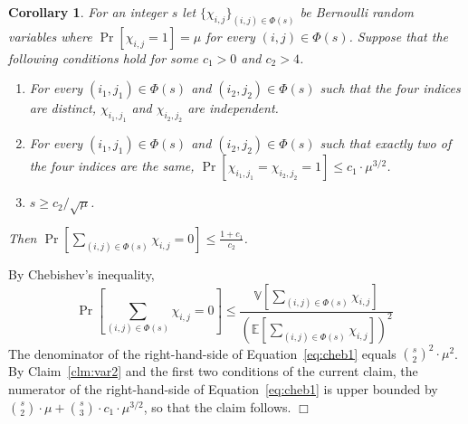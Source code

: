 \documentclass{article}
\newcommand{\Ex}{\mathbb{E}}
\newcommand{\Var}{\mathbb{V}}
\newenvironment{proof}{\smallskip\noindent{\bf Proof:}}%
        {\hspace*{\fill}$\Box$\par}
\newtheorem{corollary}[theorem]{Corollary}
\newcommand{\talya}[1]{{} }
\begin{document}
\begin{corollary}\label{cor:cheb1}
For an integer $s$
let $\{\chi_{i,j}\}_{(i,j)\in \Phi(s)}$ be Bernoulli random variables where
 $\Pr[\chi_{i,j} = 1] = \mu$ for every $(i,j)\in \Phi(s)$. Suppose that the following conditions hold
 for some $c_1>0$ and $c_2 > 4$.
\begin{enumerate}
\item For every $(i_1,j_1)\in \Phi(s)$ and $(i_2,j_2)\in \Phi(s)$ such that the four indices are distinct, $\chi_{i_1,j_1}$
and $\chi_{i_2,j_2}$ are independent.
\item For every $(i_1,j_1)\in \Phi(s)$ and $(i_2,j_2)\in \Phi(s)$  such that exactly two of the four indices are the same,
$\Pr[\chi_{i_1,j_1}=\chi_{i_2,j_2} = 1] \leq c_1\cdot \mu^{3/2}$.
\item %
   $s \geq c_2/\sqrt{\mu}$\;.
\end{enumerate}
Then $\Pr\left[ \sum_{(i,j)\in \Phi(s)} \chi_{i,j} = 0\right] \leq \frac{1+c_1}{c_2}$.
\end{corollary}

\begin{proof}
By Chebishev's inequality,
\begin{equation}\label{eq:cheb1}
\Pr\left[\sum_{(i,j)\in \Phi(s)}\chi_{i,j}=0\right] \leq \frac{\Var\left[\sum_{(i,j)\in \Phi(s)} \chi_{i,j}\right]}{\left(\Ex\left[\sum_{(i,j)\in \Phi(s)}\chi_{i,j}\right]\right)^2}\;
\end{equation}
The denominator of the right-hand-side of Equation~\eqref{eq:cheb1} equals
${s\choose 2}^2\cdot \mu^2$.
By Claim~\ref{clm:var2} and the first two conditions of the current claim, the numerator of the right-hand-side of Equation~\eqref{eq:cheb1} is upper bounded by
${s\choose 2}\cdot \mu + {s\choose 3}\cdot c_1\cdot \mu^{3/2}$, so that the claim follows.
\end{proof}
\end{document}
